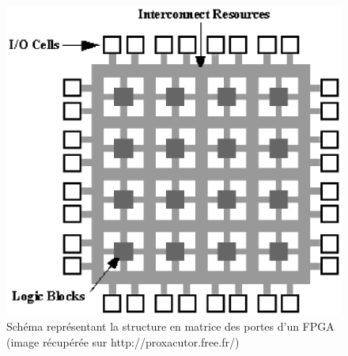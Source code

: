\begin{figure}
\begin{center}
\includegraphics[scale=0.5]{porte.eps}
\end{center}
\caption{Schéma représentant la structure en matrice des portes d'un FPGA (image récupérée sur http://proxacutor.free.fr/)}
\end{figure}

